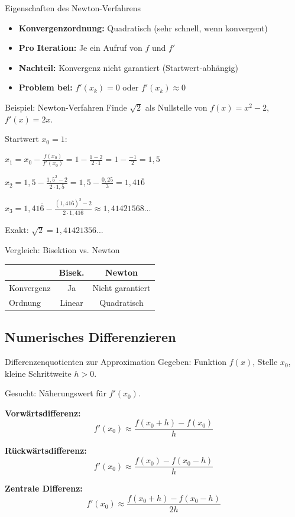\documentclass[a4paper,fontsize = 7pt]{scrartcl}
\renewcommand*{\arraystretch}{2}
\begin{document}
\begin{subbox}{Eigenschaften des Newton-Verfahrens}
\begin{itemize}
	\item \textbf{Konvergenzordnung:} Quadratisch (sehr schnell, wenn konvergent)
	\item \textbf{Pro Iteration:} Je ein Aufruf von $f$ und $f'$
	\item \textbf{Nachteil:} Konvergenz nicht garantiert (Startwert-abhängig)
	\item \textbf{Problem bei:} $f'(x_k) = 0$ oder $f'(x_k) \approx 0$
\end{itemize}
\end{subbox}

\begin{subbox}{Beispiel: Newton-Verfahren}
Finde $\sqrt{2}$ als Nullstelle von $f(x) = x^2 - 2$, $f'(x) = 2x$.

Startwert $x_0 = 1$:

$x_1 = x_0 - \frac{f(x_0)}{f'(x_0)} = 1 - \frac{1-2}{2 \cdot 1} = 1 - \frac{-1}{2} = 1{,}5$

$x_2 = 1{,}5 - \frac{1{,}5^2 - 2}{2 \cdot 1{,}5} = 1{,}5 - \frac{0{,}25}{3} = 1{,}41\overline{6}$

$x_3 = 1{,}41\overline{6} - \frac{(1{,}41\overline{6})^2 - 2}{2 \cdot 1{,}41\overline{6}} \approx 1{,}41421568...$

Exakt: $\sqrt{2} = 1{,}41421356...$
\end{subbox}

\begin{mainbox}{Vergleich: Bisektion vs. Newton}
\renewcommand*{\arraystretch}{1.3}
\begin{center}
\begin{tabular}{l|c|c}
& \textbf{Bisek.} & \textbf{Newton} \\
\hline
Konvergenz & Ja & Nicht garantiert \\
Ordnung & Linear & Quadratisch \\
\end{tabular}
\end{center}
\end{mainbox}

\subsection{Numerisches Differenzieren}

\begin{mainbox}{Differenzenquotienten zur Approximation}
Gegeben: Funktion $f(x)$, Stelle $x_0$, kleine Schrittweite $h > 0$.

Gesucht: Näherungswert für $f'(x_0)$.

\textbf{Vorwärtsdifferenz:}
$$f'(x_0) \approx \frac{f(x_0 + h) - f(x_0)}{h}$$

\textbf{Rückwärtsdifferenz:}
$$f'(x_0) \approx \frac{f(x_0) - f(x_0 - h)}{h}$$

\textbf{Zentrale Differenz:}
$$f'(x_0) \approx \frac{f(x_0 + h) - f(x_0 - h)}{2h}$$
\end{mainbox}
\end{document}
